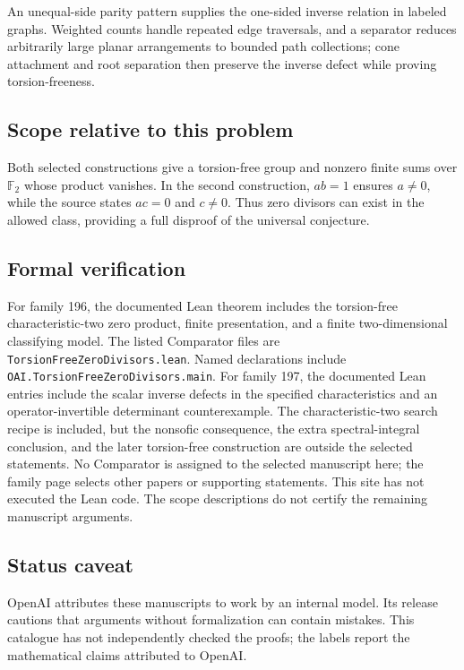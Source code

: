 \documentclass[11pt]{article}
\begin{document}
An unequal-side parity pattern supplies the one-sided inverse relation in labeled graphs. Weighted counts handle repeated edge traversals, and a separator reduces arbitrarily large planar arrangements to bounded path collections; cone attachment and root separation then preserve the inverse defect while proving torsion-freeness.

\subsection{Scope relative to this problem}
Both selected constructions give a torsion-free group and nonzero finite sums over $\mathbb F_2$ whose product vanishes. In the second construction, $ab=1$ ensures $a\ne0$, while the source states $ac=0$ and $c\ne0$. Thus zero divisors can exist in the allowed class, providing a full disproof of the universal conjecture.

\subsection{Formal verification}
For family 196, the documented Lean theorem includes the torsion-free characteristic-two zero product, finite presentation, and a finite two-dimensional classifying model. The listed Comparator files are \texttt{TorsionFreeZeroDivisors.lean}. Named declarations include \texttt{OAI.TorsionFreeZeroDivisors.main}. For family 197, the documented Lean entries include the scalar inverse defects in the specified characteristics and an operator-invertible determinant counterexample. The characteristic-two search recipe is included, but the nonsofic consequence, the extra spectral-integral conclusion, and the later torsion-free construction are outside the selected statements. No Comparator is assigned to the selected manuscript here; the family page selects other papers or supporting statements. This site has not executed the Lean code. The scope descriptions do not certify the remaining manuscript arguments.

\subsection{Status caveat}
OpenAI attributes these manuscripts to work by an internal model. Its release cautions that arguments without formalization can contain mistakes. This catalogue has not independently checked the proofs; the labels report the mathematical claims attributed to OpenAI.
\end{document}
